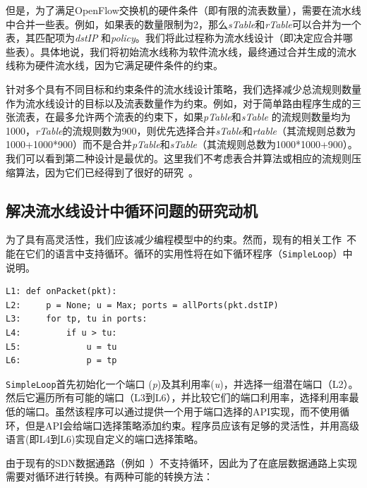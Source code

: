 但是，为了满足OpenFlow交换机的硬件条件（即有限的流表数量），需要在流水线中合并一些表。例如，如果表的数量限制为2，那么\emph{sTable}和\emph{rTable}可以合并为一个表，其匹配项为\emph{dstIP} 和\emph{policy}。我们将此过程称为流水线设计（即决定应合并哪些表）。具体地说，我们将初始流水线称为软件流水线，最终通过合并生成的流水线称为硬件流水线，因为它满足硬件条件的约束。

针对多个具有不同目标和约束条件的流水线设计策略，我们选择减少总流规则数量作为流水线设计的目标以及流表数量作为约束。例如，对于简单路由程序生成的三张流表，在最多允许两个流表的约束下，如果\emph{pTable}和\emph{sTable} 的流规则数量均为1000，\emph{rTable}的流规则数为900，则优先选择合并\emph{sTable}和\emph{rtable}（其流规则总数为1000+1000*900）而不是合并\emph{pTable}和\emph{sTable}（其流规则总数为1000*1000+900）。我们可以看到第二种设计是最优的。这里我们不考虑表合并算法或相应的流规则压缩算法，因为它们已经得到了很好的研究~\cite{ge2015h,gupta2001algorithms}。

\subsection{解决流水线设计中循环问题的研究动机}
为了具有高灵活性，我们应该减少编程模型中的约束。然而，现有的相关工作~\cite{snap,sivaraman2016packet}不能在它们的语言中支持循环。循环的实用性将在如下循环程序（\texttt{SimpleLoop}）中说明。

\begin{small}
\begin{verbatim}
L1: def onPacket(pkt):
L2:     p = None; u = Max; ports = allPorts(pkt.dstIP)
L3:     for tp, tu in ports:
L4:         if u > tu:
L5:             u = tu
L6:             p = tp
\end{verbatim}
\end{small}

\texttt{SimpleLoop}首先初始化一个端口 (\emph{p})及其利用率(\emph{u})，并选择一组潜在端口（L2）。然后它遍历所有可能的端口（L3到L6），并比较它们的端口利用率，选择利用率最低的端口。虽然该程序可以通过提供一个用于端口选择的API实现，而不使用循环，但是API会给端口选择策略添加约束。程序员应该有足够的灵活性，并用高级语言(即L4到L6)实现自定义的端口选择策略。 

由于现有的SDN数据通路（例如~\cite{OF-DPA}）不支持循环，因此为了在底层数据通路上实现需要对循环进行转换。有两种可能的转换方法：

